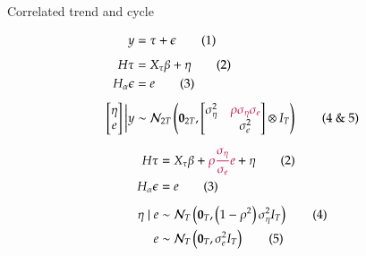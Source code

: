 \documentclass[notes,blackandwhite,mathsans,usenames,dvipsnames]{beamer}
\begin{document}
\begin{frame}{Correlated trend and cycle}

 \small
\begin{align*}
y &= \tau + \epsilon \tag{1}\\[1ex]
H\tau &=  X_\tau \beta + \eta\tag{2}\\
H_\alpha \epsilon &=  e\tag{3}\\[1ex]
\begin{bmatrix}\eta \\ e\end{bmatrix}\bigg|y &\sim \mathcal{N}_{2T}\left(\mathbf{0}_{2T}, \begin{bmatrix}\sigma_\eta^2 & {\color{purple}\rho \sigma_\eta \sigma_e} \\  & \sigma_e^2\end{bmatrix} \otimes I_T\right) \tag{4 \& 5}
\end{align*}

\normalsize{} \small
\begin{align*}
H\tau &=  X_\tau \beta  +  {\color{purple}\rho \frac{\sigma_\eta}{ \sigma_e} e} + \eta\tag{2}\\
H_\alpha \epsilon &=  e\tag{3}\\[1ex]
\eta \mid e &\sim \mathcal{N}_{T}\left(\mathbf{0}_{T}, \left(1-\rho^2\right)\sigma_\eta^2  I_T\right)\tag{4}\\
e &\sim \mathcal{N}_{T}\left(\mathbf{0}_{T}, \sigma_e^2  I_T\right)\tag{5}
\end{align*}

\end{frame}
\end{document}
